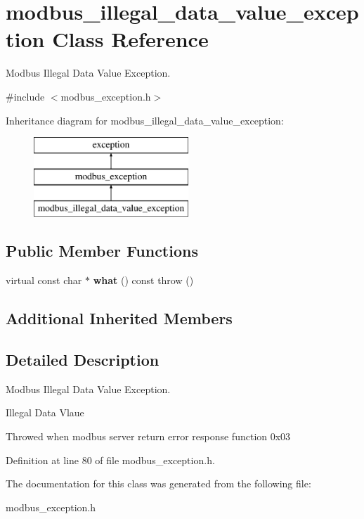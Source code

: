 \hypertarget{classmodbus__illegal__data__value__exception}{}\section{modbus\+\_\+illegal\+\_\+data\+\_\+value\+\_\+exception Class Reference}
\label{classmodbus__illegal__data__value__exception}


Modbus Illegal Data Value Exception.  




{\ttfamily \#include $<$modbus\+\_\+exception.\+h$>$}

Inheritance diagram for modbus\+\_\+illegal\+\_\+data\+\_\+value\+\_\+exception\+:\begin{figure}[H]
\begin{center}
\leavevmode
\includegraphics[height=3.000000cm]{classmodbus__illegal__data__value__exception}
\end{center}
\end{figure}
\subsection*{Public Member Functions}
\begin{DoxyCompactItemize}
\item 
\mbox{\label{classmodbus__illegal__data__value__exception_a3cc9b8945a9f36c74427692b135f981b}} 
virtual const char $\ast$ {\bfseries what} () const  throw ()
\end{DoxyCompactItemize}
\subsection*{Additional Inherited Members}


\subsection{Detailed Description}
Modbus Illegal Data Value Exception. 

Illegal Data Vlaue

Throwed when modbus server return error response function 0x03 

Definition at line 80 of file modbus\+\_\+exception.\+h.



The documentation for this class was generated from the following file\+:\begin{DoxyCompactItemize}
\item 
modbus\+\_\+exception.\+h\end{DoxyCompactItemize}
